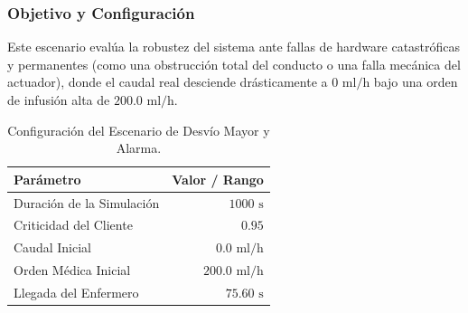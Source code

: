 \documentclass[11pt,a4paper]{article}
\begin{document}
\subsubsection{Objetivo y Configuración}
Este escenario evalúa la robustez del sistema ante fallas de hardware catastróficas y permanentes (como una obstrucción total del conducto o una falla mecánica del actuador), donde el caudal real desciende drásticamente a $0\text{ ml/h}$ bajo una orden de infusión alta de $200.0\text{ ml/h}$.

\begin{table}[H]
    \centering
    \begin{tabular}{lr}
        \toprule
        \textbf{Parámetro} & \textbf{Valor / Rango} \\
        \midrule
        Duración de la Simulación & $1000\text{ s}$ \\
        Criticidad del Cliente & $0.95$ \\
        Caudal Inicial & $0.0\text{ ml/h}$ \\
        Orden Médica Inicial & $200.0\text{ ml/h}$ \\
        Llegada del Enfermero & $75.60\text{ s}$ \\
        \bottomrule
    \end{tabular}
    \caption{Configuración del Escenario de Desvío Mayor y Alarma.}
    \label{tab:config_desvio_mayor}
\end{table}
\end{document}
